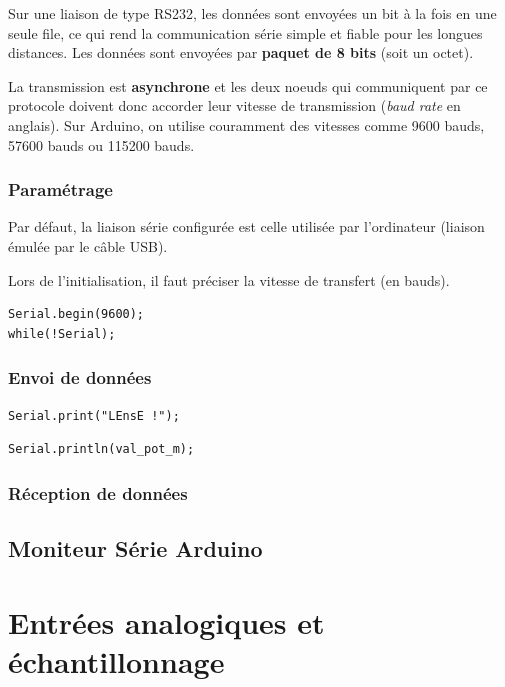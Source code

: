 \documentclass[a4paper,11pt,titlepage]{article} %
\begin{document}
Sur une liaison de type RS232, les données sont envoyées un bit à la fois en une seule file, ce qui rend la communication série simple et fiable pour les longues distances. Les données sont envoyées par \textbf{paquet de 8 bits} (soit un octet).

La transmission est \textbf{asynchrone} et les deux noeuds qui communiquent par ce protocole doivent donc accorder leur vitesse de transmission (\textit{baud rate} en anglais). Sur Arduino, on utilise couramment des vitesses comme 9600 bauds, 57600 bauds ou 115200 bauds.


\subsubsection{Paramétrage}

Par défaut, la liaison série configurée est celle utilisée par l'ordinateur (liaison émulée par le câble USB).

Lors de l'initialisation, il faut préciser la vitesse de transfert (en bauds).

\begin{lstlisting}
Serial.begin(9600);
while(!Serial);
\end{lstlisting}


\subsubsection{Envoi de données}

\begin{lstlisting}
Serial.print("LEnsE !");
\end{lstlisting}

\begin{lstlisting}
Serial.println(val_pot_m);
\end{lstlisting}

\subsubsection{Réception de données}

\subsection{Moniteur Série Arduino}

\newpage
\section{Entrées analogiques et échantillonnage}
\end{document}

